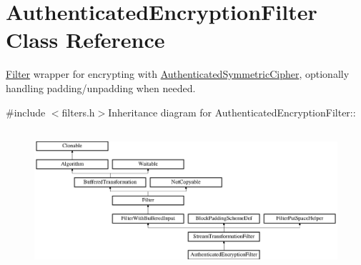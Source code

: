 \hypertarget{class_authenticated_encryption_filter}{
\section{AuthenticatedEncryptionFilter Class Reference}
\label{class_authenticated_encryption_filter}
}


\hyperlink{class_filter}{Filter} wrapper for encrypting with \hyperlink{class_authenticated_symmetric_cipher}{AuthenticatedSymmetricCipher}, optionally handling padding/unpadding when needed.  


{\ttfamily \#include $<$filters.h$>$}Inheritance diagram for AuthenticatedEncryptionFilter::\begin{figure}[H]
\begin{center}
\leavevmode
\includegraphics[height=5.24064cm]{class_authenticated_encryption_filter}
\end{center}
\end{figure}
